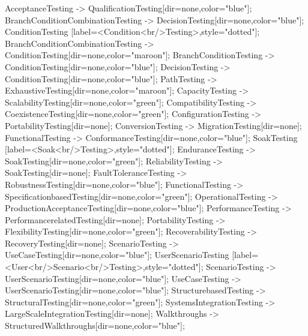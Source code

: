 \documentclass{article}
\begin{document}
{AcceptanceTesting -> QualificationTesting[dir=none,color="blue"];
BranchConditionCombinationTesting -> DecisionTesting[dir=none,color="blue"];
ConditionTesting [label=<Condition<br/>Testing>,style="dotted"];
BranchConditionCombinationTesting -> ConditionTesting[dir=none,color="maroon"];
BranchConditionTesting -> ConditionTesting[dir=none,color="blue"];
DecisionTesting -> ConditionTesting[dir=none,color="blue"];
PathTesting -> ExhaustiveTesting[dir=none,color="maroon"];
CapacityTesting -> ScalabilityTesting[dir=none,color="green"];
CompatibilityTesting -> CoexistenceTesting[dir=none,color="green"];
ConfigurationTesting -> PortabilityTesting[dir=none];
ConversionTesting -> MigrationTesting[dir=none];
FunctionalTesting -> ConformanceTesting[dir=none,color="blue"];
SoakTesting [label=<Soak<br/>Testing>,style="dotted"];
EnduranceTesting -> SoakTesting[dir=none,color="green"];
ReliabilityTesting -> SoakTesting[dir=none];
FaultToleranceTesting -> RobustnessTesting[dir=none,color="blue"];
FunctionalTesting -> SpecificationbasedTesting[dir=none,color="green"];
OperationalTesting -> ProductionAcceptanceTesting[dir=none,color="blue"];
PerformanceTesting -> PerformancerelatedTesting[dir=none];
PortabilityTesting -> FlexibilityTesting[dir=none,color="green"];
RecoverabilityTesting -> RecoveryTesting[dir=none];
ScenarioTesting -> UseCaseTesting[dir=none,color="blue"];
UserScenarioTesting [label=<User<br/>Scenario<br/>Testing>,style="dotted"];
ScenarioTesting -> UserScenarioTesting[dir=none,color="blue"];
UseCaseTesting -> UserScenarioTesting[dir=none,color="blue"];
StructurebasedTesting -> StructuralTesting[dir=none,color="green"];
SystemsIntegrationTesting -> LargeScaleIntegrationTesting[dir=none];
Walkthroughs -> StructuredWalkthroughs[dir=none,color="blue"];

}
\end{document}
